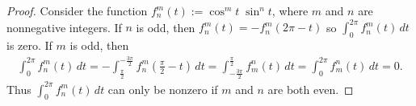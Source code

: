 \begin{proof}

  
  Consider the function $f^m_n(t):=\cos^m t\;\sin^n t$, where $m$ and $n$ are nonnegative integers. If $n$ is odd, then $f^m_n(t)=-f^m_n(2\pi- t)$ so $\int_0^{2\pi}f^m_n(t)\,dt$ is zero. If $m$ is odd, then
  \begin{align*} \int_0^{2\pi}f^m_n(t)\,dt=-\int_{\frac\pi2}^{-\frac{3\pi}2}f^m_n(\frac\pi2-t)\,dt=\int^{\frac\pi2}_{-\frac{3\pi}2}f^n_m(t)\,dt=\int^{2\pi}_0f^n_m(t)\,dt=0.
\end{align*} 
  Thus $\int_0^{2\pi}f^m_n(t)\,dt$ can only be nonzero if $m$ and $n$ are both even. 
  

\end{proof}
